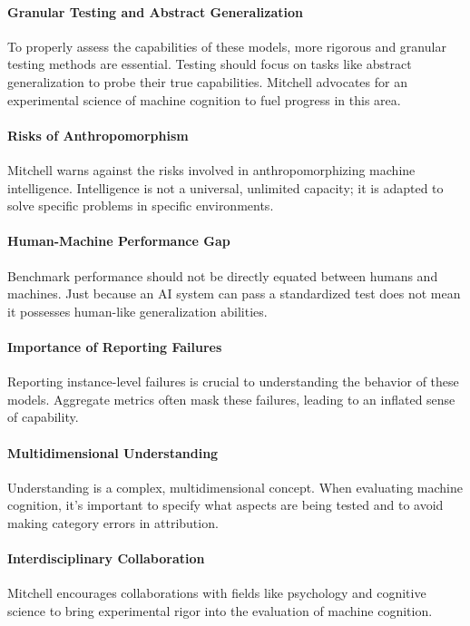 \paragraph{Granular Testing and Abstract Generalization}
To properly assess the capabilities of these models, more rigorous and granular testing methods are essential. Testing should focus on tasks like abstract generalization to probe their true capabilities. Mitchell advocates for an experimental science of machine cognition to fuel progress in this area.

\paragraph{Risks of Anthropomorphism}
Mitchell warns against the risks involved in anthropomorphizing machine intelligence. Intelligence is not a universal, unlimited capacity; it is adapted to solve specific problems in specific environments.

\paragraph{Human-Machine Performance Gap}
Benchmark performance should not be directly equated between humans and machines. Just because an AI system can pass a standardized test does not mean it possesses human-like generalization abilities.

\paragraph{Importance of Reporting Failures}
Reporting instance-level failures is crucial to understanding the behavior of these models. Aggregate metrics often mask these failures, leading to an inflated sense of capability.

\paragraph{Multidimensional Understanding}
Understanding is a complex, multidimensional concept. When evaluating machine cognition, it's important to specify what aspects are being tested and to avoid making category errors in attribution.

\paragraph{Interdisciplinary Collaboration}
Mitchell encourages collaborations with fields like psychology and cognitive science to bring experimental rigor into the evaluation of machine cognition.

